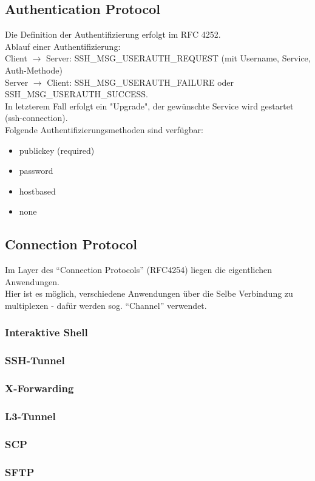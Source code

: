 \documentclass[fleqn,10pt]{SelfArx} %
\begin{document}
\subsection{Authentication Protocol}
Die Definition der Authentifizierung erfolgt im RFC 4252.\\	
Ablauf einer Authentifizierung:\\	
Client $\rightarrow$ Server: SSH\_MSG\_USERAUTH\_REQUEST (mit Username, Service, Auth-Methode) \\	
Server $\rightarrow$ Client: SSH\_MSG\_USERAUTH\_FAILURE	
oder SSH\_MSG\_USERAUTH\_SUCCESS.\\	
In letzterem Fall erfolgt ein "Upgrade", der gewünschte Service wird gestartet (ssh-connection).\\	
Folgende Authentifizierungsmethoden sind verfügbar:	
\begin{itemize}	
	\item publickey (required)	
	\item password	
	\item hostbased	
	\item none	
\end{itemize}
\subsection{Connection Protocol}
Im Layer des \enquote{Connection Protocols} (RFC4254) liegen die eigentlichen Anwendungen.\\
Hier ist es möglich, verschiedene Anwendungen über die Selbe Verbindung zu multiplexen - dafür werden sog. \enquote{Channel} verwendet.
\subsubsection{Interaktive Shell}
\subsubsection{SSH-Tunnel}
\subsubsection{X-Forwarding}
\subsubsection{L3-Tunnel}
\subsubsection{SCP}
\subsubsection{SFTP}
\end{document}
